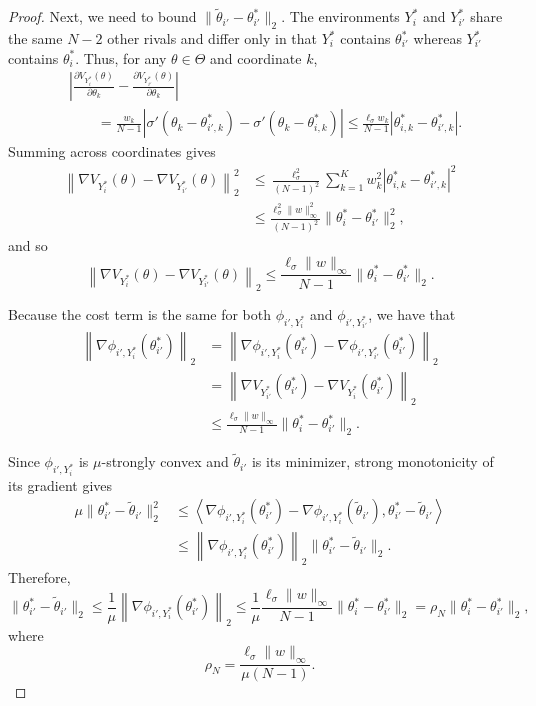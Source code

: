 \begin{proof}
Next, we need to bound $\lVert\widetilde\theta_{i'}-\theta_{i'}^* \rVert_2$. 
The environments $Y_i^*$ and $Y_{i'}^*$ share the same $N-2$ other rivals and differ only in that $Y_i^*$ contains $\theta_{i'}^*$ whereas $Y_{i'}^*$ contains $\theta_i^*$. 
Thus, for any $\theta\in\Theta$ and coordinate $k$,
\[
\begin{aligned}
&
\left|
\frac{\partial V_{Y_i^*}(\theta)}{\partial\theta_k}
-
\frac{\partial V_{Y_{i'}^*}(\theta)}{\partial\theta_k}
\right| \\
&\qquad =
\frac{w_k}{N-1}
\left|
\sigma'(\theta_k-\theta_{i',k}^*)
-
\sigma'(\theta_k-\theta_{i,k}^*)
\right| \leq \frac{\ell_\sigma w_k}{N-1}
|\theta_{i,k}^*-\theta_{i',k}^*|.
\end{aligned}
\]
Summing across coordinates gives
\[
\begin{aligned}
\left\|
\nabla V_{Y_i^*}(\theta)
-\nabla V_{Y_{i'}^*}(\theta)
\right\|_2^2
&\le
\frac{\ell_\sigma^2}{(N-1)^2}
\sum_{k=1}^K
w_k^2
|\theta_{i,k}^*-\theta_{i',k}^*|^2\\
&\le
\frac{\ell_\sigma^2\|w\|_\infty^2}{(N-1)^2}
\|\theta_i^*-\theta_{i'}^*\|_2^2,
\end{aligned}
\]
and so
\[
    \left\|
    \nabla V_{Y_i^*}(\theta)
    -
    \nabla V_{Y_{i'}^*}(\theta)
    \right\|_2
    \le
    \frac{\ell_\sigma\|w\|_\infty}{N-1}
    \|\theta_i^*-\theta_{i'}^*\|_2.
\]

Because the cost term is the same for both $\phi_{i',Y_{i}^*}$ and $\phi_{i',Y_{i'}^*}$, we have that 
\[
\begin{aligned}
    \left\|
    \nabla\phi_{i',Y_i^*}(\theta_{i'}^*)
    \right\|_2
    &=
    \left\|
    \nabla\phi_{i',Y_i^*}(\theta_{i'}^*)
    -
    \nabla\phi_{i',Y_{i'}^*}(\theta_{i'}^*)
    \right\|_2 \\
    &=
    \left\|
    \nabla V_{Y_{i'}^*}(\theta_{i'}^*)
    -
    \nabla V_{Y_i^*}(\theta_{i'}^*)
    \right\|_2 \\
    &\le
    \frac{\ell_\sigma\|w\|_\infty}{N-1}
    \|\theta_i^*-\theta_{i'}^*\|_2.
\end{aligned}
\]

Since $\phi_{i',Y_i^*}$ is $\mu$-strongly convex and
$\widetilde\theta_{i'}$ is its minimizer, strong monotonicity of its
gradient gives
\[
\begin{aligned}
    \mu
    \|\theta_{i'}^*-\widetilde\theta_{i'}\|_2^2
    &\le
    \left\langle
    \nabla\phi_{i',Y_i^*}(\theta_{i'}^*)
    -
    \nabla\phi_{i',Y_i^*}(\widetilde\theta_{i'}),
    \theta_{i'}^*-\widetilde\theta_{i'}
    \right\rangle \\
    &\le
    \left\|
    \nabla\phi_{i',Y_i^*}(\theta_{i'}^*)
    \right\|_2
    \|\theta_{i'}^*-\widetilde\theta_{i'}\|_2.
\end{aligned}
\]
Therefore,
\[
    \|\theta_{i'}^*-\widetilde\theta_{i'}\|_2
    \le
    \frac{1}{\mu}
    \left\|
    \nabla\phi_{i',Y_i^*}(\theta_{i'}^*)
    \right\|_2 \leq \frac{1}{\mu} \frac{\ell_\sigma\|w\|_\infty}{N-1}
    \|\theta_i^*-\theta_{i'}^*\|_2 = \rho_{N} \lVert \theta_i^*-\theta_{i'}^* \rVert_2,
\]
where
\[
    \rho_N
    =
    \frac{\ell_\sigma\|w\|_\infty}
         {\mu(N-1)}.
\]


\end{proof}
